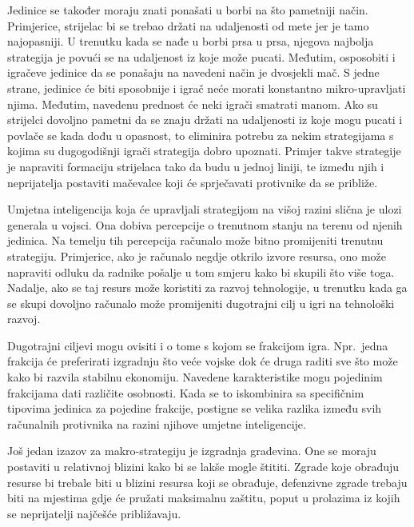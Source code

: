 \documentclass[times, utf8, zavrsni, numeric]{fer}
\begin{document}
\par Jedinice se također moraju znati ponašati u borbi na što pametniji način. Primjerice, strijelac bi se trebao držati na udaljenosti od mete jer je tamo najopasniji.
U trenutku kada se nađe u borbi prsa u prsa, njegova najbolja strategija je povući se na udaljenost iz koje može pucati.
Međutim, osposobiti i igračeve jedinice da se ponašaju na navedeni način  je dvosjekli mač.
S jedne strane, jedinice će biti sposobnije i igrač neće morati konstantno mikro-upravljati njima.
Međutim, navedenu prednost će neki igrači smatrati manom.
Ako su strijelci dovoljno pametni da se znaju držati na udaljenosti iz koje mogu pucati i povlače se kada dođu u opasnost, to eliminira potrebu za nekim strategijama s kojima su dugogodišnji igrači strategija dobro upoznati.
Primjer takve strategije je napraviti formaciju strijelaca tako da budu u jednoj liniji, te između njih i neprijatelja postaviti mačevalce koji će sprječavati protivnike da se približe.


\par Umjetna inteligencija koja će upravljali strategijom na višoj razini slična je ulozi generala u vojsci. 
Ona dobiva percepcije o trenutnom stanju na terenu od njenih jedinica.
Na temelju tih percepcija računalo može bitno promijeniti trenutnu strategiju. Primjerice, ako je računalo negdje otkrilo izvore resursa, ono može napraviti odluku da radnike pošalje u tom smjeru kako bi skupili što više toga.
Nadalje, ako se taj resurs može koristiti za razvoj tehnologije, u trenutku kada ga se skupi dovoljno računalo može promijeniti dugotrajni cilj u igri na tehnološki razvoj.

\par Dugotrajni ciljevi mogu ovisiti i o tome s kojom se frakcijom igra. 
Npr.\ jedna frakcija će preferirati izgradnju što veće vojske dok će druga raditi sve što može kako bi razvila stabilnu ekonomiju.
Navedene karakteristike mogu pojedinim frakcijama dati različite osobnosti.
Kada se to iskombinira sa specifičnim tipovima jedinica za pojedine frakcije, postigne se velika razlika između svih računalnih protivnika na razini njihove umjetne inteligencije.

\par Još jedan izazov za makro-strategiju je izgradnja građevina.
One se moraju postaviti u relativnoj blizini kako bi se lakše mogle štititi.
Zgrade koje obrađuju resurse bi trebale biti u blizini resursa koji se obrađuje, defenzivne zgrade trebaju biti na mjestima gdje će pružati maksimalnu zaštitu, poput u prolazima iz kojih se neprijatelji najčešće približavaju.
\end{document}
